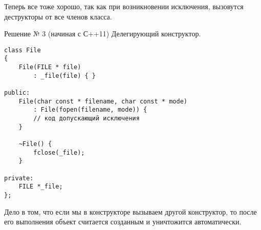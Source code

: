 Теперь все тоже хорошо, так как при возникновении исключения, вызовутся деструкторы от все членов класса.

Решение № 3 (начиная с С++11)
Делегирующий конструктор.
\begin{verbatim}
class File
{
    File(FILE * file)
        : _file(file) { }

public:
    File(char const * filename, char const * mode)
        : File(fopen(filename, mode)) {
        // код допускающий исключения
    }

    ~File() {
        fclose(_file);
    }

private:
    FILE *_file;
};
\end{verbatim}

Дело в том, что если мы в конструкторе вызываем другой конструктор, то после его выполнения объект считается созданным и уничтожится автоматически.
